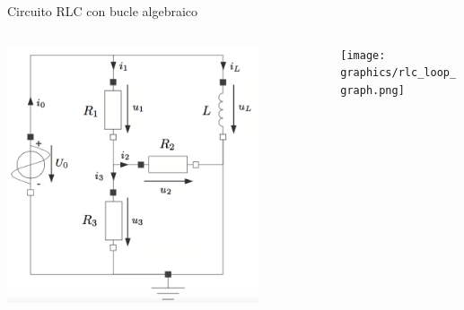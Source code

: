 \begin{frame}[fragile]{Circuito RLC con bucle algebraico}
    \begin{columns}
        \begin{column}{0.5\textwidth}
            \includegraphics[width=0.8\textwidth]{graphics/rlc_loop.png}
        \end{column}
        \begin{column}{0.5\textwidth}
            \texttt{[image: graphics/rlc\_loop\_graph.png]}
        \end{column}
    \end{columns}
\end{frame}

